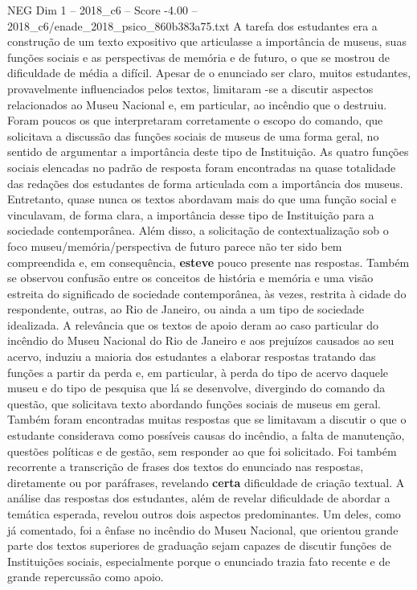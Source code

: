 \begin{textsample}{NEG Dim 1 – 2018\_c6 – Score -4.00 – 2018\_c6/enade\_2018\_psico\_860b383a75.txt}
A tarefa dos estudantes era a construção de um texto expositivo que articulasse a importância de museus, suas funções sociais e as perspectivas de memória e de futuro, o que se mostrou de dificuldade de média a difícil.
Apesar de o enunciado ser claro, muitos estudantes, provavelmente influenciados pelos textos, limitaram -se a discutir aspectos relacionados ao Museu Nacional e, em particular, ao incêndio que o destruiu.
Foram poucos os que interpretaram corretamente o escopo do comando, que solicitava a discussão das funções sociais de museus de uma forma geral, no sentido de argumentar a importância deste tipo de Instituição.
As quatro funções sociais elencadas no padrão de resposta foram encontradas na quase totalidade das redações dos estudantes de forma articulada com a importância dos museus.
Entretanto, quase nunca os textos abordavam mais do que uma função social e vinculavam, de forma clara, a importância desse tipo de Instituição para a sociedade contemporânea.
Além disso, a solicitação de contextualização sob o foco museu/memória/perspectiva de futuro parece não ter sido bem compreendida e, em consequência, \textbf{esteve} pouco presente nas respostas.
Também se observou confusão entre os conceitos de história e memória e uma visão estreita do significado de sociedade contemporânea, às vezes, restrita à cidade do respondente, outras, ao Rio de Janeiro, ou ainda a um tipo de sociedade idealizada.
A relevância que os textos de apoio deram ao caso particular do incêndio do Museu Nacional do Rio de Janeiro e aos prejuízos causados ao seu acervo, induziu a maioria dos estudantes a elaborar respostas tratando das funções a partir da perda e, em particular, à perda do tipo de acervo daquele museu e do tipo de pesquisa que lá se desenvolve, divergindo do comando da questão, que solicitava texto abordando funções sociais de museus em geral.
Também foram encontradas muitas respostas que se limitavam a discutir o que o estudante considerava como possíveis causas do incêndio, a falta de manutenção, questões políticas e de gestão, sem responder ao que foi solicitado.
Foi também recorrente a transcrição de frases dos textos do enunciado nas respostas, diretamente ou por paráfrases, revelando \textbf{certa} dificuldade de criação textual.
A análise das respostas dos estudantes, além de revelar dificuldade de abordar a temática esperada, revelou outros dois aspectos predominantes.
Um deles, como já comentado, foi a ênfase no incêndio do Museu Nacional, que orientou grande parte dos textos superiores de graduação sejam capazes de discutir funções de Instituições sociais, especialmente porque o enunciado trazia fato recente e de grande repercussão como apoio.

\end{textsample}
